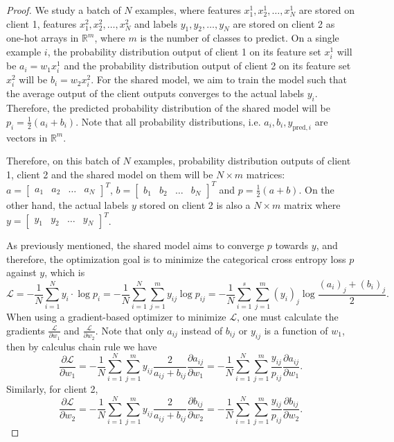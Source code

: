 \documentclass{article}
\begin{document}
\begin{proof}
We study a batch of $N$ examples, where features $x_1^1,x_2^1,\ldots,x_N^1$ are stored on client 1, features $x_1^2,x_2^2,\ldots,x_N^2$ and labels $y_1,y_2,\ldots,y_N$ are stored on client 2 as one-hot arrays in $\mathbb{R}^m$, where $m$ is the number of classes to predict. On a single example $i$, the probability distribution output of client 1 on its feature set $x_i^1$ will be $a_i=w_1x_i^1$ and the probability distribution output of client 2 on its feature set $x_i^2$ will be $b_i=w_2x_i^2$. For the shared model, we aim to train the model such that the average output of the client outputs converges to the actual labels $y_i$. Therefore, the predicted probability distribution of the shared model will be $p_i=\frac{1}{2}(a_i+b_i)$. Note that all probability distributions, i.e. $a_i,b_i,y_{\text{pred},i}$ are vectors in $\mathbb{R}^m$.

Therefore, on this batch of $N$ examples, probability distribution outputs of client 1, client 2 and the shared model on them will be $N\times m$ matrices: $a=\begin{bmatrix}a_1&a_2&\ldots&a_N\end{bmatrix}^T$, $b=\begin{bmatrix}b_1&b_2&\ldots&b_N\end{bmatrix}^T$ and $p=\frac{1}{2}(a+b)$. On the other hand, the actual labels $y$ stored on client 2 is also a $N\times m$ matrix where $y=\begin{bmatrix}y_1&y_2&\ldots&y_N\end{bmatrix}^T$.

As previously mentioned, the shared model aims to converge $p$ towards $y$, and therefore, the optimization goal is to minimize the categorical cross entropy loss $p$ against $y$, which is
$$
  \mathcal{L}=-\frac{1}{N}\sum_{i=1}^N y_i \cdot \log p_i = -\frac{1}{N}\sum_{i=1}^N \sum_{j=1}^m y_{ij}\log p_{ij}=-\frac{1}{N}\sum_{i=1}^s \sum_{j=1}^m (y_i)_j\log \frac{(a_i)_j+(b_i)_j}{2}.
$$
When using a gradient-based optimizer to minimize $\mathcal{L}$, one must calculate the gradients $\frac{\mathcal{L}}{\partial w_1}$ and $\frac{\mathcal{L}}{\partial w_2}$. Note that only $a_{ij}$ instead of $b_{ij}$ or $y_{ij}$ is a function of $w_1$, then by calculus chain rule we have
\begin{equation}
  \label{client1}
  \frac{\partial\mathcal{L}}{\partial w_1}=-\frac{1}{N}\sum_{i=1}^N \sum_{j=1}^m y_{ij}\frac{2}{a_{ij}+b_{ij}}\frac{\partial a_{ij}}{\partial w_1}=-\frac{1}{N}\sum_{i=1}^N \sum_{j=1}^m\frac{y_{ij}}{p_{ij}}\frac{\partial a_{ij}}{\partial w_1}.
\end{equation}
Similarly, for client 2,
\begin{equation}
  \label{client2}
  \frac{\partial\mathcal{L}}{\partial w_2}=-\frac{1}{N}\sum_{i=1}^N \sum_{j=1}^m y_{ij}\frac{2}{a_{ij}+b_{ij}}\frac{\partial b_{ij}}{\partial w_2}=-\frac{1}{N}\sum_{i=1}^N \sum_{j=1}^m\frac{y_{ij}}{p_{ij}}\frac{\partial b_{ij}}{\partial w_2}.
\end{equation}


\end{proof}
\end{document}

